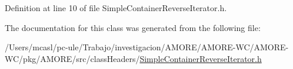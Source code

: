 Definition at line 10 of file SimpleContainerReverseIterator.h.



The documentation for this class was generated from the following file:\begin{DoxyCompactItemize}
\item 
/Users/mcasl/pc-\/ule/Trabajo/investigacion/AMORE/AMORE-\/WC/AMORE-\/WC/pkg/AMORE/src/classHeaders/\hyperlink{_simple_container_reverse_iterator_8h}{SimpleContainerReverseIterator.h}\end{DoxyCompactItemize}
